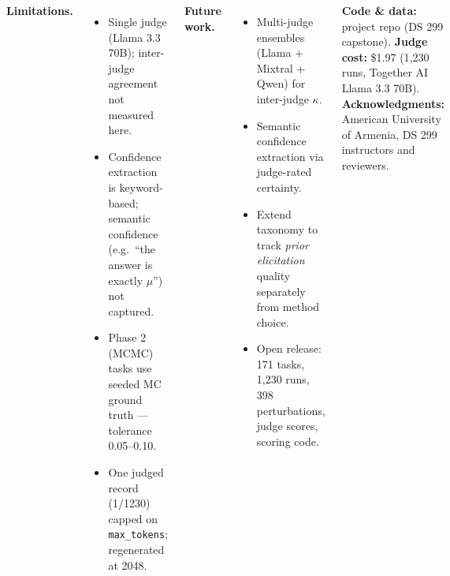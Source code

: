 \documentclass[a0paper,landscape,25pt,margin=1cm,innermargin=15mm,blockverticalspace=10mm,colspace=10mm,subcolspace=8mm]{tikzposter}
\begin{document}
\begin{columns}
{    \vspace{2mm}
    \textbf{Limitations.}
    \begin{itemize}[leftmargin=6mm,itemsep=1mm]
      \item Single judge (Llama 3.3 70B); inter-judge agreement not
        measured here.
      \item Confidence extraction is keyword-based; semantic confidence
        (e.g.\ ``the answer is exactly $\mu$'') not captured.
      \item Phase 2 (MCMC) tasks use seeded MC ground truth ---
        tolerance 0.05--0.10.
      \item One judged record (1/1230) capped on \texttt{max\_tokens};
        regenerated at 2048.
    \end{itemize}

    \vspace{2mm}
    \textbf{Future work.}
    \begin{itemize}[leftmargin=6mm,itemsep=1mm]
      \item Multi-judge ensembles (Llama + Mixtral + Qwen) for
        inter-judge $\kappa$.
      \item Semantic confidence extraction via judge-rated certainty.
      \item Extend taxonomy to track \emph{prior elicitation} quality
        separately from method choice.
      \item Open release: 171 tasks, 1{,}230 runs, 398 perturbations,
        judge scores, scoring code.
    \end{itemize}

    \vspace{2mm}
    \footnotesize
    \textbf{Code \& data:} project repo (DS 299 capstone).
    \textbf{Judge cost:} \$1.97 (1{,}230 runs, Together AI Llama 3.3 70B).
    \textbf{Acknowledgments:} American University of Armenia, DS 299
    instructors and reviewers.
  }
\end{columns}
\end{document}
